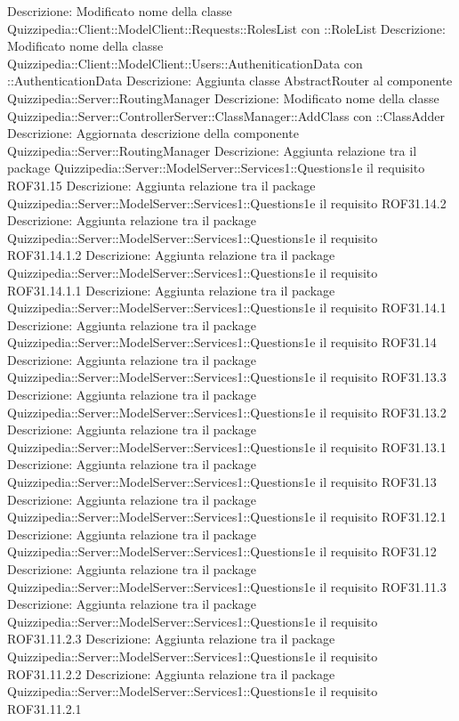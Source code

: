 Descrizione: Modificato nome della classe Quizzipedia::Client::ModelClient::Requests::RolesList con ::RoleList 
Descrizione: Modificato nome della classe Quizzipedia::Client::ModelClient::Users::AutheniticationData con ::AuthenticationData 
Descrizione: Aggiunta classe AbstractRouter al componente Quizzipedia::Server::RoutingManager 
Descrizione: Modificato nome della classe Quizzipedia::Server::ControllerServer::ClassManager::AddClass con ::ClassAdder 
Descrizione: Aggiornata descrizione della componente Quizzipedia::Server::RoutingManager 
Descrizione: Aggiunta relazione tra il package Quizzipedia::Server::ModelServer::Services1::Questions1e il requisito ROF31.15 
Descrizione: Aggiunta relazione tra il package Quizzipedia::Server::ModelServer::Services1::Questions1e il requisito ROF31.14.2 
Descrizione: Aggiunta relazione tra il package Quizzipedia::Server::ModelServer::Services1::Questions1e il requisito ROF31.14.1.2 
Descrizione: Aggiunta relazione tra il package Quizzipedia::Server::ModelServer::Services1::Questions1e il requisito ROF31.14.1.1 
Descrizione: Aggiunta relazione tra il package Quizzipedia::Server::ModelServer::Services1::Questions1e il requisito ROF31.14.1 
Descrizione: Aggiunta relazione tra il package Quizzipedia::Server::ModelServer::Services1::Questions1e il requisito ROF31.14 
Descrizione: Aggiunta relazione tra il package Quizzipedia::Server::ModelServer::Services1::Questions1e il requisito ROF31.13.3 
Descrizione: Aggiunta relazione tra il package Quizzipedia::Server::ModelServer::Services1::Questions1e il requisito ROF31.13.2 
Descrizione: Aggiunta relazione tra il package Quizzipedia::Server::ModelServer::Services1::Questions1e il requisito ROF31.13.1 
Descrizione: Aggiunta relazione tra il package Quizzipedia::Server::ModelServer::Services1::Questions1e il requisito ROF31.13 
Descrizione: Aggiunta relazione tra il package Quizzipedia::Server::ModelServer::Services1::Questions1e il requisito ROF31.12.1 
Descrizione: Aggiunta relazione tra il package Quizzipedia::Server::ModelServer::Services1::Questions1e il requisito ROF31.12 
Descrizione: Aggiunta relazione tra il package Quizzipedia::Server::ModelServer::Services1::Questions1e il requisito ROF31.11.3 
Descrizione: Aggiunta relazione tra il package Quizzipedia::Server::ModelServer::Services1::Questions1e il requisito ROF31.11.2.3 
Descrizione: Aggiunta relazione tra il package Quizzipedia::Server::ModelServer::Services1::Questions1e il requisito ROF31.11.2.2 
Descrizione: Aggiunta relazione tra il package Quizzipedia::Server::ModelServer::Services1::Questions1e il requisito ROF31.11.2.1 
